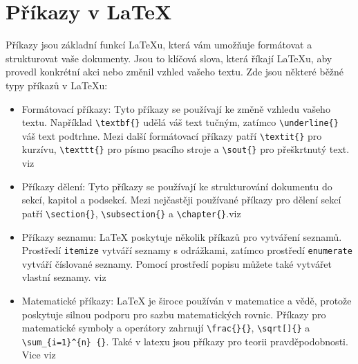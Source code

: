 \documentclass[a4paper, 11pt]{article}
\begin{document}
\section{Příkazy v \LaTeX}
Příkazy jsou základní funkcí LaTeXu, která vám umožňuje formátovat a strukturovat vaše dokumenty. 
Jsou to klíčová slova, která říkají LaTeXu, aby provedl konkrétní akci nebo změnil vzhled vašeho textu. 
Zde jsou některé běžné typy příkazů v LaTeXu:
    \begin{itemize}
        \item Formátovací příkazy: Tyto příkazy se používají ke změně vzhledu vašeho textu. 
        Například \verb|\textbf{}| udělá váš text tučným, zatímco \verb|\underline{}| váš text podtrhne. 
        Mezi další formátovací příkazy patří \verb|\textit{}| pro kurzívu, \verb|\texttt{}| pro písmo psacího stroje a \verb|\sout{}| pro 
        přeškrtnutý text. viz \cite{Overleaf}
        \item Příkazy dělení: Tyto příkazy se používají 
        ke strukturování dokumentu do sekcí, kapitol a podsekcí. Mezi nejčastěji 
        používané příkazy pro dělení sekcí patří \verb|\section{}|, 
        \verb|\subsection{}| a \verb|\chapter{}|.viz \cite{Stack}
        \item Příkazy seznamu: LaTeX poskytuje několik příkazů pro vytváření seznamů. 
        Prostředí \verb|itemize| vytváří seznamy s odrážkami, zatímco prostředí \verb|enumerate| vytváří číslované seznamy. 
        Pomocí prostředí popisu můžete také vytvářet vlastní seznamy. viz \cite{Latexlist}
        \item Matematické příkazy: LaTeX je široce používán v matematice a vědě, 
        protože poskytuje silnou podporu pro sazbu matematických rovnic. Příkazy pro 
        matematické symboly a operátory zahrnují \verb|\frac{}{}|, \verb|\sqrt[]{}| a \verb|\sum_{i=1}^{n} {}|.
        Také v latexu jsou příkazy pro teorii pravděpodobnosti. Vice viz \cite{Bakalarska2}

    \end{itemize}
\newpage


\renewcommand{\refname}{Literatura}

\end{document}
